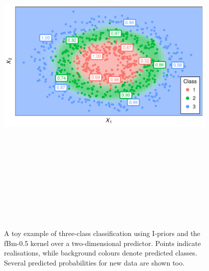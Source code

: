 \documentclass{beamer}
\newlength{\onecolwid}
\newlength{\twocolwid}
\begin{document}
\begin{frame}[t]
\begin{columns}[t]
\begin{column}{\twocolwid}
\begin{columns}[t,totalwidth=\twocolwid]
\begin{column}{\onecolwid}
\vspace{-1.8cm}
\begin{figure}[t]
  \includegraphics[width=\linewidth,height=17cm]{figure/iprobit_multiclass}
  \vspace{-2cm}
  \caption{A toy example of three-class classification using I-priors and the fBm-0.5 kernel over a two-dimensional predictor. Points indicate realisations, while background colours denote predicted classes. Several predicted probabilities for new data are shown too.}
\end{figure}

\end{column}

\end{columns}

\end{column}



\spacercolumn
\begin{column}{\onecolwid}




\end{column}
\end{columns}
\end{frame}
\end{document}
